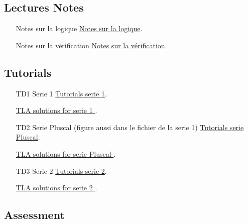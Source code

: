 \documentclass[ 12pt]{article}
\begin{document}
  \subsection{Lectures Notes}

  \begin{itemize}
  \item[]   Notes sur la logique
    \href{http://mery54.github.io/teaching/movex/lecturesnotes/preprint-chapterlogique.pdf}{Notes sur la logique}.

     \item[]   Notes sur la vérification
    \href{http://mery54.github.io/teaching/movex/lecturesnotes/preprint-chapterverification.pdf}{Notes sur la vérification}.

  \end{itemize}


  

\subsection{Tutorials}

  \begin{itemize}
  \item[TD1]   Serie  1
    \href{http://mery54.github.io/teaching/aspd/lecturesnotes/aspd-app-td1.pdf}{Tutorials 
      serie 1}.

        \href{http://mery54.github.io/teaching/aspd/models/tlatd1.zip}{TLA 
           solutions for serie 1
         }.

\item[TD2]   Serie  Pluscal (figure aussi dans le fichier de la serie 1)
    \href{http://mery54.github.io/teaching/aspd/lecturesnotes/aspd-app-pluscal.pdf}{Tutorials 
      serie Pluscal}.

        \href{http://mery54.github.io/teaching/aspd/models/tdpluscal.zip}{TLA 
           solutions for serie Pluscal
         }.
         

         
\item[TD3]   Serie  2
    \href{http://mery54.github.io/teaching/aspd/lecturesnotes/aspd-app-td2.pdf}{Tutorials 
      serie 2}.

        \href{http://mery54.github.io/teaching/aspd/models/tlatd2.zip}{TLA 
           solutions for serie 2
         }.

           \end{itemize}

  
  
  \subsection{Assessment}
\label{sec:project}
\end{document}

